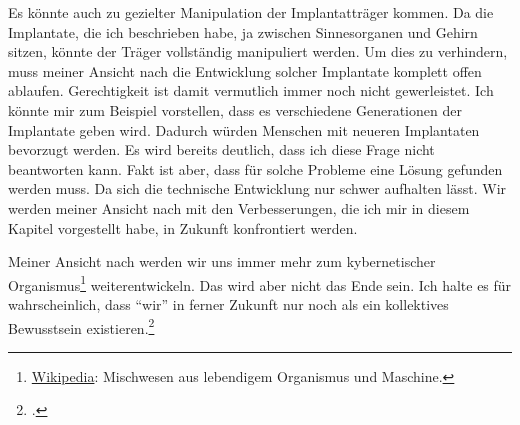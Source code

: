 Es könnte auch zu gezielter Manipulation der Implantatträger kommen. Da die Implantate, die ich
beschrieben habe, ja zwischen Sinnesorganen und Gehirn sitzen, könnte der Träger vollständig
manipuliert werden. Um dies zu verhindern, muss meiner Ansicht nach die Entwicklung solcher
Implantate komplett offen ablaufen.
Gerechtigkeit ist damit vermutlich immer noch nicht gewerleistet. Ich könnte mir zum Beispiel
vorstellen, dass es verschiedene Generationen der Implantate geben wird. Dadurch würden Menschen mit
neueren Implantaten bevorzugt werden.
Es wird bereits deutlich, dass ich diese Frage nicht beantworten kann. Fakt ist aber, dass für solche
Probleme eine Lösung gefunden werden muss. Da sich die technische Entwicklung nur schwer aufhalten
lässt. Wir werden meiner Ansicht nach mit den Verbesserungen, die ich mir in diesem Kapitel
vorgestellt habe, in Zukunft konfrontiert werden.

Meiner Ansicht nach werden wir uns immer mehr zum kybernetischer
Organismus\footnote{\href{http://de.wikipedia.org/wiki/Cyborg}{Wikipedia}: Mischwesen aus lebendigem
Organismus und Maschine.} weiterentwickeln.
Das wird aber nicht das Ende sein. Ich halte es für wahrscheinlich, dass \enquote{wir} in ferner
Zukunft nur noch als ein kollektives Bewusstsein
existieren.\footcite{Heise:Telepolis:Mensch:globale_Gehirn}
